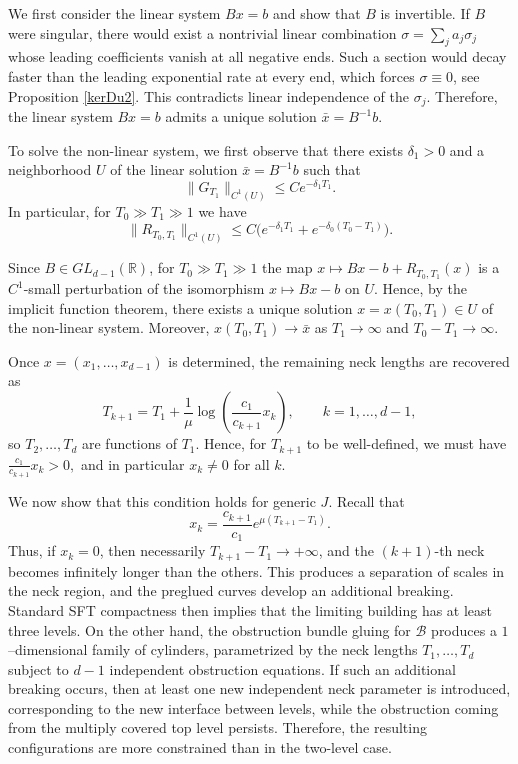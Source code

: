 \documentclass{amsart}
\newcommand{\R}{\mathbb{R}}
\begin{document}
We first consider the linear system $Bx=b$ and show that $B$ is invertible.
If $B$ were singular, there would exist a nontrivial linear combination
$\sigma=\sum_j a_j\sigma_j$ whose leading coefficients vanish at all
negative ends.
Such a section would decay faster than the leading exponential rate at
every end, which forces $\sigma\equiv0$, see Proposition \ref{kerDu2}.
This contradicts linear independence of the $\sigma_j$. Therefore, the linear system $Bx=b$ admits a unique solution
$\bar x = B^{-1} b$.

To solve the non-linear system, we first observe that there exists $\delta_1>0$ and a neighborhood $U$ of the linear solution
$\bar x=B^{-1}b$ such that
$$
\|G_{T_1}\|_{C^1(U)} \le C e^{-\delta_1 T_1}.
$$
In particular, for $T_0\gg T_1\gg 1$ we have
$$
\|R_{T_0,T_1}\|_{C^1(U)} \le C\big(e^{-\delta_1 T_1}+e^{-\delta_0 (T_0-T_1)}\big).
$$

Since $B\in GL_{d-1}(\R)$, for $T_0\gg T_1\gg 1$ the map
$x\mapsto Bx-b+R_{T_0,T_1}(x)$ is a $C^1$-small perturbation of the
isomorphism $x\mapsto Bx-b$ on $U$.
Hence, by the implicit function theorem, there exists a unique solution
$x=x(T_0, T_1)\in U$ of the non-linear system. Moreover, $x(T_0,T_1)\to\bar x$ as
$T_1\to\infty$ and $T_0-T_1\to\infty$.


 Once $x=(x_1,\ldots, x_{d-1})$ is determined, the remaining neck lengths are recovered as
$$
T_{k+1} = T_1 + \frac{1}{\mu}\log \left(\frac{c_1}{c_{k+1}}x_k\right),
\qquad k=1,\dots,d-1,
$$
so $T_2,\dots,T_d$ are functions of $T_1$.  Hence, for $T_{k+1}$ to be well-defined, we must have
$
\frac{c_1}{c_{k+1}} x_k > 0,
$
and in particular $x_k \neq 0$ for all $k$.

We now show that this condition holds for generic $J$. Recall that
\[
x_k = \frac{c_{k+1}}{c_1} e^{\mu(T_{k+1}-T_1)}.
\]
Thus, if $x_k = 0$, then necessarily $T_{k+1}-T_1 \to +\infty$, and
the $(k+1)$-th neck becomes infinitely longer than the others.
This produces a separation of scales in the neck region, and the
preglued curves develop an additional breaking. Standard SFT
compactness then implies that the limiting building has at least three
levels.
On the other hand, the obstruction bundle gluing for $\mathcal B$
produces a $1$--dimensional family of cylinders, parametrized by the
neck lengths $T_1,\dots,T_d$ subject to $d-1$ independent obstruction
equations.
If such an additional breaking occurs, then at least one new independent
neck parameter is introduced, corresponding to the new interface between
levels, while the obstruction coming from the multiply covered top level
persists. Therefore, the resulting configurations are more constrained
than in the two-level case.
\end{document}
